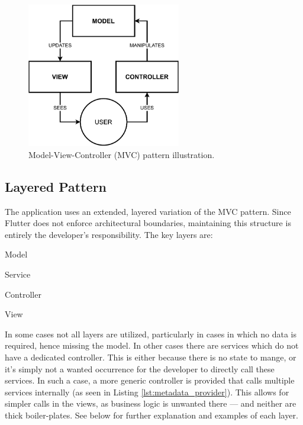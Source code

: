 \documentclass[
  digital,     %
  oneside,     %
  nosansbold,  %
  nocolorbold, %
  lof,         %
  lot,         %
]{fithesis4}
\begin{document}
\begin{figure}[!hb]
    \centering
    \includegraphics[width=0.6\textwidth]{assets/diagrams/mvc.drawio.pdf}
    \caption[Model-View-Controller pattern]{Model-View-Controller (\gls{MVC}) pattern illustration.}
    \label{fig:mvc-pattern}
\end{figure}

\subsection{Layered Pattern}
The application uses an extended, layered variation of the \gls{MVC} pattern. Since Flutter does not enforce architectural boundaries, maintaining this structure is entirely the developer's responsibility. The key layers are:

\begin{compactitem}
    \item Model
    \item Service
    \item Controller
    \item View
\end{compactitem}

In some cases not all layers are utilized, particularly in cases in which no data is required, hence missing the model. In other cases there are services which do not have a dedicated controller. This is either because there is no state to mange, or it's simply not a wanted occurrence for the developer to directly call these services. In such a case, a more generic controller is provided that calls multiple services internally (as seen in Listing \ref{lst:metadata_provider}). This allows for simpler calls in the views, as business logic is unwanted there --- and neither are thick boiler-plates. See below for further explanation and examples of each layer.
\end{document}
